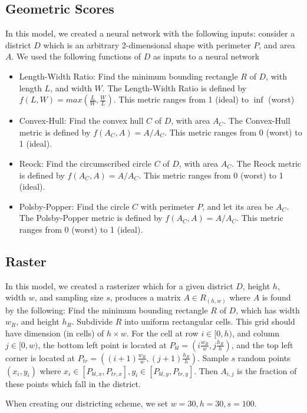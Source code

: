 \documentclass{article}
\begin{document}
\subsection{Geometric Scores}
In this model, we created a neural network with the following inputs: consider a district $D$ which is an arbitrary 2-dimensional shape with perimeter $P$, and area $A$. We used the following functions of $D$ as inputs to a neural network
\begin{itemize}
\item Length-Width Ratio: Find the minimum bounding rectangle $R$ of $D$, with length $L$, and width $W$. The Length-Width Ratio is defined by$f(L, W) = max(\frac{L}{W}, \frac{W}{L})$. This metric ranges from 1 (ideal) to $\inf$ (worst)
\item Convex-Hull: Find the convex hull $C$ of $D$, with area $A_C$. The Convex-Hull metric is defined by $f(A_C, A) = A / A_C$. This metric ranges from 0 (worst) to 1 (ideal).
\item Reock: Find the circumscribed circle $C$ of $D$, with area $A_C$. The Reock metric is defined by $f(A_C, A) = A / A_C$. This metric ranges from 0 (worst) to 1 (ideal).
\item Polsby-Popper: Find the circle $C$ with perimeter $P$, and let its area be $A_C$. The Polsby-Popper metric is defined by $f(A_C, A) = A / A_C$. This metric ranges from 0 (worst) to 1 (ideal).
\end{itemize}

\subsection{Raster}
In this model, we created a rasterizer which for a given district $D$, height $h$, width $w$, and sampling size $s$, produces a matrix $A\in R_{(h, w)}$ where $A$ is found by the following: Find the minimum bounding rectangle $R$ of $D$, which has width $w_R$, and height $h_R$. Subdivide $R$ into uniform rectangular cells. This grid should have dimension (in cells) of $h\times w$. For the cell at row $i\in[0, h)$, and column $j\in[0, w)$, the bottom left point is located at $P_{bl}=(i\frac{w_R}{w}, j\frac{h_R}{h})$, and the top left corner is located at $P_{tr}=((i+1)\frac{w_R}{w}, (j+1)\frac{h_R}{h})$. Sample $s$ random points $(x_i, y_i)$ where $x_i\in [P_{bl, x}, P_{tr, x}], y_i\in [P_{bl, y}, P_{tr, y}]$. Then $A_{i, j}$ is the fraction of these points which fall in the district.

When creating our districting scheme, we set $w=30, h=30, s=100$.
\end{document}
